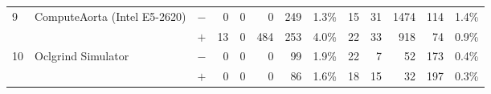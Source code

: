 \begin{tabular}{lll | rrrrr | rrrrr }
\hline
\multirow{ 2}{*}{9} & \multirow{ 2}{*}{ComputeAorta (Intel E5-2620)} & $-$ & 0 & 0 & 0 & 249 & 1.3\%       & 15 & 31 & 1474 & 114 & 1.4\% \\& & $+$ & 13 & 0 & 484 & 253 & 4.0\% & 22 & 33 & 918 & 74 & 0.9\% \\
\hline
\multirow{ 2}{*}{10} & \multirow{ 2}{*}{Oclgrind Simulator} & $-$ & 0 & 0 & 0 & 99 & 1.9\%       & 22 & 7 & 52 & 173 & 0.4\% \\& & $+$ & 0 & 0 & 0 & 86 & 1.6\% & 18 & 15 & 32 & 197 & 0.3\% \\
  \bottomrule
\end{tabular}


